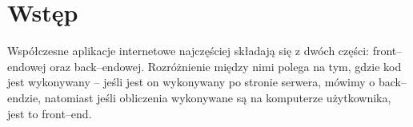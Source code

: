 \documentclass[main.tex]{subfiles}
\begin{document}
\section{Wstęp}
Współczesne aplikacje internetowe najczęściej składają się z dwóch części: front--endowej oraz back--endowej. Rozróżnienie między nimi polega na tym, gdzie kod jest wykonywany -- jeśli jest on wykonywany po stronie serwera, mówimy o back--endzie, natomiast jeśli obliczenia wykonywane są na komputerze użytkownika, jest to front--end.
\end{document}
